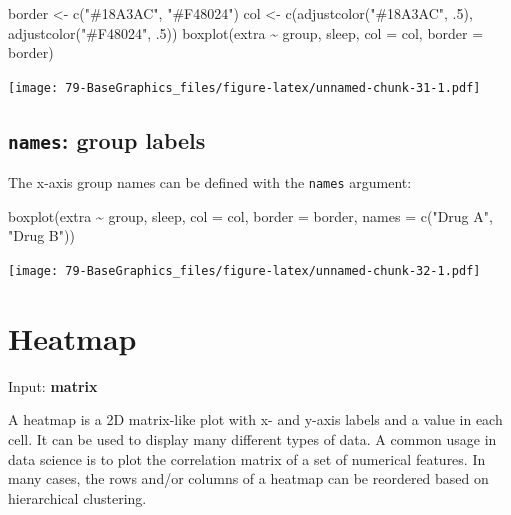 \documentclass[
]{book}
\newenvironment{Shaded}{\begin{snugshade}}{\end{snugshade}}
\newcommand{\AttributeTok}[1]{\textcolor[rgb]{0.77,0.63,0.00}{#1}}
\newcommand{\DecValTok}[1]{\textcolor[rgb]{0.00,0.00,0.81}{#1}}
\newcommand{\FunctionTok}[1]{\textcolor[rgb]{0.00,0.00,0.00}{#1}}
\newcommand{\NormalTok}[1]{#1}
\newcommand{\OtherTok}[1]{\textcolor[rgb]{0.56,0.35,0.01}{#1}}
\newcommand{\SpecialCharTok}[1]{\textcolor[rgb]{0.00,0.00,0.00}{#1}}
\newcommand{\StringTok}[1]{\textcolor[rgb]{0.31,0.60,0.02}{#1}}
\begin{document}
\begin{Shaded}
\begin{Highlighting}[]
\NormalTok{border }\OtherTok{\textless{}{-}} \FunctionTok{c}\NormalTok{(}\StringTok{"\#18A3AC"}\NormalTok{, }\StringTok{"\#F48024"}\NormalTok{)}
\NormalTok{col }\OtherTok{\textless{}{-}} \FunctionTok{c}\NormalTok{(}\FunctionTok{adjustcolor}\NormalTok{(}\StringTok{"\#18A3AC"}\NormalTok{, .}\DecValTok{5}\NormalTok{), }\FunctionTok{adjustcolor}\NormalTok{(}\StringTok{"\#F48024"}\NormalTok{, .}\DecValTok{5}\NormalTok{))}
\FunctionTok{boxplot}\NormalTok{(extra }\SpecialCharTok{\textasciitilde{}}\NormalTok{ group, sleep,}
        \AttributeTok{col =}\NormalTok{ col, }\AttributeTok{border =}\NormalTok{ border)}
\end{Highlighting}
\end{Shaded}

\texttt{[image: 79-BaseGraphics\_files/figure-latex/unnamed-chunk-31-1.pdf]}

\hypertarget{names-group-labels}{%
\subsection{\texorpdfstring{\textbf{\texttt{names}}: group labels}{names: group labels}}\label{names-group-labels}}

The x-axis group names can be defined with the \texttt{names} argument:

\begin{Shaded}
\begin{Highlighting}[]
\FunctionTok{boxplot}\NormalTok{(extra }\SpecialCharTok{\textasciitilde{}}\NormalTok{ group, sleep,}
        \AttributeTok{col =}\NormalTok{ col, }\AttributeTok{border =}\NormalTok{ border,}
        \AttributeTok{names =} \FunctionTok{c}\NormalTok{(}\StringTok{"Drug A"}\NormalTok{, }\StringTok{"Drug B"}\NormalTok{))}
\end{Highlighting}
\end{Shaded}

\texttt{[image: 79-BaseGraphics\_files/figure-latex/unnamed-chunk-32-1.pdf]}

\hypertarget{heatmap}{%
\section{Heatmap}\label{heatmap}}

Input: \textbf{matrix}

A heatmap is a 2D matrix-like plot with x- and y-axis labels and a value in each cell. It can be used to display many different types of data. A common usage in data science is to plot the correlation matrix of a set of numerical features. In many cases, the rows and/or columns of a heatmap can be reordered based on hierarchical clustering.
\end{document}
